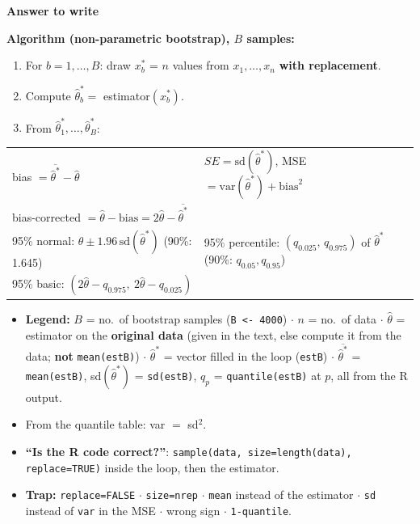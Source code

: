 \documentclass[10pt]{article}
\newcommand{\R}[1]{\texttt{#1}}
\newcommand{\trap}[1]{\textcolor{trap}{\textbf{Trap:} #1}}
\newcommand{\always}{\textcolor{always}{$\bullet$}}
\newcommand{\Q}[1]{\textbf{``#1''}}
\renewcommand{\section}[1]{\par\vspace{8pt}{\large\bfseries\color{head}#1}\par\vspace{1pt}{\color{head}\hrule}\vspace{3pt}}
\newenvironment{answer}[1][Answer to write]{\par\vspace{2pt}\begin{shaded}\small\textbf{#1}\par\vspace{1pt}}{\end{shaded}\vspace{-2pt}}
\begin{document}
\section{\always{} 6. Bootstrap}

\begin{answer}
\textbf{Algorithm (non-parametric bootstrap), $B$ samples:}
\begin{enumerate}
\item For $b=1,\dots,B$: draw $x^*_b$ = $n$ values from $x_1,\dots,x_n$ \textbf{with replacement}.
\item Compute $\hat\theta^*_b=$ estimator$(x^*_b)$.
\item From $\hat\theta^*_1,\dots,\hat\theta^*_B$:
\end{enumerate}
\begin{tabular}{@{}ll@{}}
bias $=\overline{\hat\theta^*}-\hat\theta$ & $SE=\mathrm{sd}(\hat\theta^*)$, \quad MSE $=\mathrm{var}(\hat\theta^*)+\text{bias}^2$\\
bias-corrected $=\hat\theta-\text{bias}=2\hat\theta-\overline{\hat\theta^*}$ & \\
95\% normal: $\hat\theta\pm1.96\,\mathrm{sd}(\hat\theta^*)$ (90\%: 1.645) & 95\% percentile: $(q_{0.025},\,q_{0.975})$ of $\hat\theta^*$ (90\%: $q_{0.05},q_{0.95}$)\\
95\% basic: $(2\hat\theta-q_{0.975},\ 2\hat\theta-q_{0.025})$ & \\
\end{tabular}
\end{answer}
\begin{itemize}
\item \textbf{Legend:} $B$ = no.\ of bootstrap samples (\R{B <- 4000}) $\cdot$ $n$ = no.\ of data $\cdot$ $\hat\theta$ = estimator on the \textbf{original data} (given in the text, else compute it from the data; \textbf{not} \R{mean(estB)}) $\cdot$ $\hat\theta^*$ = vector filled in the loop (\R{estB}) $\cdot$ $\overline{\hat\theta^*}$ = \R{mean(estB)}, sd$(\hat\theta^*)$ = \R{sd(estB)}, $q_p$ = \R{quantile(estB)} at $p$, all from the R output.
\item From the quantile table: var $=$ sd$^2$.
\item \Q{Is the R code correct?}: \R{sample(data, size=length(data), replace=TRUE)} inside the loop, then the estimator.
\item \trap{\R{replace=FALSE} $\cdot$ \R{size=nrep} $\cdot$ \R{mean} instead of the estimator $\cdot$ \R{sd} instead of \R{var} in the MSE $\cdot$ wrong sign $\cdot$ \R{1-quantile}.}
\end{itemize}
\end{document}
